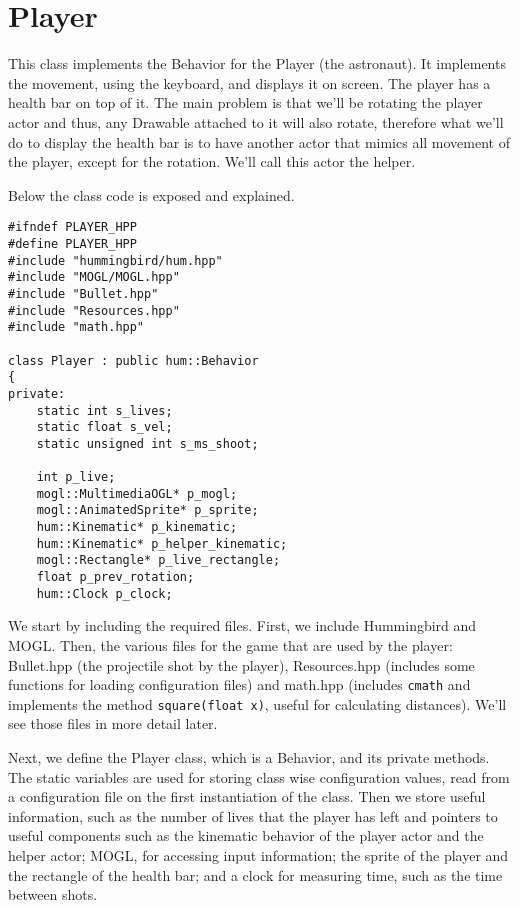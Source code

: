 \section{Player}

This class implements the Behavior for the Player (the astronaut). It implements 
the movement, using the keyboard, and displays it on screen. The player has a health 
bar on top of it. The main problem is that we'll be rotating the player actor and thus, 
any Drawable attached to it will also rotate, therefore what we'll do to display the health 
bar is to have another actor that mimics all movement of the player, except for the rotation. 
We'll call this actor the helper.

Below the class code is exposed and explained.

\begin{lstlisting}
#ifndef PLAYER_HPP
#define PLAYER_HPP
#include "hummingbird/hum.hpp"
#include "MOGL/MOGL.hpp"
#include "Bullet.hpp"
#include "Resources.hpp"
#include "math.hpp"

class Player : public hum::Behavior
{
private:
    static int s_lives;
    static float s_vel;
    static unsigned int s_ms_shoot;

    int p_live;
    mogl::MultimediaOGL* p_mogl;
    mogl::AnimatedSprite* p_sprite;
    hum::Kinematic* p_kinematic;
    hum::Kinematic* p_helper_kinematic;
    mogl::Rectangle* p_live_rectangle;
    float p_prev_rotation;
    hum::Clock p_clock;

\end{lstlisting}

We start by including the required files. First, we include Hummingbird and MOGL. 
Then, the various files for the game that are used by the player: Bullet.hpp (the projectile 
shot by the player), Resources.hpp (includes some functions for loading configuration files) and 
math.hpp (includes \texttt{cmath} and implements the method \texttt{square(float x)}, useful for 
calculating distances). We'll see those files in more detail later.

Next, we define the Player class, which is a Behavior, and its private methods.  The 
static variables are used for storing class wise configuration values, read from a 
configuration file on the first instantiation of the class. Then we store useful information, 
such as the number of lives that the player has left and pointers to useful components 
such as the kinematic behavior of the player actor and the helper actor; MOGL, for 
accessing input information; the sprite of the player and the rectangle of the health 
bar; and a clock for measuring time, such as the time between shots.

